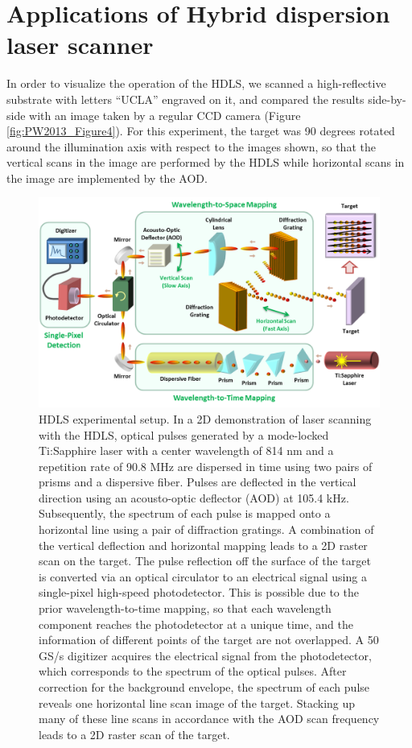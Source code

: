 \section{Applications of Hybrid dispersion laser scanner}

In order to visualize the operation of the HDLS, we scanned a high-reflective substrate with letters “UCLA” engraved on it, and compared the results side-by-side with an image taken by a regular CCD camera (Figure \ref{fig:PW2013_Figure4}). For this experiment, the target was 90 degrees rotated around the illumination axis with respect to the images shown, so that the vertical scans in the image are performed by the HDLS while horizontal scans in the image are implemented by the AOD.

\begin{figure}[htb!]
\centering
\includegraphics[scale=0.65]{PW2013/Figure2.png}
\caption{HDLS experimental setup. In a 2D demonstration of laser scanning with the HDLS, optical pulses generated by a mode-locked Ti:Sapphire laser with a center wavelength of 814 nm and a repetition rate of 90.8 MHz are dispersed in time using two pairs of prisms and a dispersive fiber. Pulses are deflected in the vertical direction using an acousto-optic deflector (AOD) at 105.4 kHz. Subsequently, the spectrum of each pulse is mapped onto a horizontal line using a pair of diffraction gratings. A combination of the vertical deflection and horizontal mapping leads to a 2D raster scan on the target. The pulse reflection off the surface of the target is converted via an optical circulator to an electrical signal using a single-pixel high-speed photodetector. This is possible due to the prior wavelength-to-time mapping, so that each wavelength component reaches the photodetector at a unique time, and the information of different points of the target are not overlapped. A 50 GS/s digitizer acquires the electrical signal from the photodetector, which corresponds to the spectrum of the optical pulses. After correction for the background envelope, the spectrum of each pulse reveals one horizontal line scan image of the target. Stacking up many of these line scans in accordance with the AOD scan frequency leads to a 2D raster scan of the target.}
\label{fig:PW2013_Figure2}
\end{figure}


